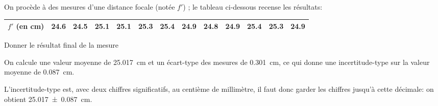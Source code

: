 \debutEntrainement


On procède à des mesures d'une distance focale (notée $f'$) ; le tableau ci-dessous recense les résultats:

\begin{center}
\renewcommand{\arraystretch}{1.2}
\begin{tabular}{|r|*{12}{c}|}
\hline
 $f'$ (en \si{\centi\metre})&   \num{24,6}&	\num{24,5}&	\num{25,1}&	\num{25,1}&	\num{25,3}&	\num{25,4}&	\num{24,9}&	\num{24,8}&	\num{24,9}&	\num{25,4}&	\num{25,3}&	\num{24,9}\\
\hline
\end{tabular}
\renewcommand{\arraystretch}{1}
\end{center}


\minusSmallskip


\begin{enonce}
Donner le résultat final de la mesure
\end{enonce}


\begin{corrige}
On calcule  une valeur moyenne de \SI{25.017}{\centi\meter} et un écart-type des mesures de \SI{0.301}{\centi\metre}, ce qui donne une incertitude-type sur la valeur moyenne de \SI{0,087}{\centi\metre}. 

L'incertitude-type est, avec deux chiffres significatifs, au centième de millimètre, il faut donc garder les chiffres jusqu'à cette décimale: on obtient \SI{25.017 \pm 0,087}{\centi\metre}.
\end{corrige}


\finEntrainement








